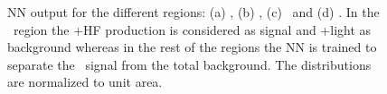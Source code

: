 \begin{figure}[tb!]
\begin{subfigure}{0.49\textwidth}
\caption{}\end{subfigure}
\caption{NN output for the different regions: (a) \fivethree, (b) \fivefour, (c) \sixthree\ and (d) \sixfour.
  In the \fivethree\ region the \ttbar+HF production is considered as signal and \ttbar+light as background
whereas in the rest of the regions the NN is trained to separate the \tth\ signal 
from the total background.  The distributions are normalized to unit area. }
\label{fig:Discriminationlj}
\end{figure}

